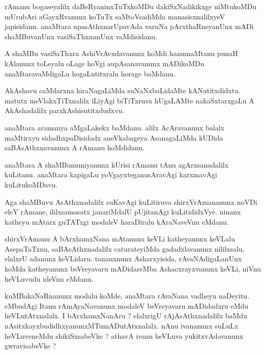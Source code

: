 \documentclass{article}
\begin{document}
\begin{mn}
rAmanu  bogaseyalilx  daBeRyaninxTuTxkoMDu  dakiSxNadikikxge  niMtukoMDu  mUrubAri  aGayxRvanunx  koTuTx  
saMtoVsadiMda  manasisxnalilxyeV  japisidanu.  anaMtara  upasAthxnarUpavAda  varuNa  pArxthaRneyanUnx  mADi  
shaMBuvanUnx  vasiSaThxnanUnx  vaMdisidanu.
\end{mn}

\begin{mn}
A  shaMBu  vasiSaThxra  AshiVrAvxdavanunx  hoMdi  hanumaMtanu  punaH  kAlanunx  toLeyalu  oLage  hoVgi  
aupAsanavanunx  mADikoMDu  anaMtaravaMdigaLu  hogaLutitxralu  horage  baMdanu.
\end{mn}

\begin{mn}
AkAshavu  caMdarxna  kiraNagaLiMda  suNaNxbaLidaMte  kANutitxdidxtu.  matutx  meVlakxTiTxnalilx  iLiyAgi  
biTiTxruva  hUgaLAMte  nakaSxtarxgaLu  A  AkAshadalilx  parxkAshisutitxdudxvu.
\end{mn}

\begin{mn}
anaMtara  aramanya  aMgaLakekx  baMdanu.  alilx  AcAravanunx  balalx  maMtirxyu  sidadhxpaDisidadx  
aneVkabageya  AsanagaLiMda  kUDida  saBAsAthxnavanunx  A  rAmanu  hoMdidanu.
\end{mn}

\begin{mn}
anaMtara  A  shaMBumuniyanunx  kUrisi  rAmanu  tAnu  agArxsanadalilx  kuLitanu.  anaMtara  kapigaLu  
yoVgayxteganusAravAgi  karxmavAgi  kuLitukoMDavu.
\end{mn}

\begin{mn}
Aga  shaMBuvu  AsAthxnadalilx  suKavAgi  kuLitiruva  shirxVrAmananunx  noVDi  eleY  rAmane,  ililxsamasatx  
janariMdalU  pUjitanAgi  kuLitididxVye.  ninanx  katheyu  mAtarx  guTATxgi  modaleV  haraDiralu  kAraNaveVnu  eMdanu.
\end{mn}

\begin{mn}
shirxVrAmanu  A  bArxhamxNana  mAtanunx  keVLi  katheyanunx  keVLalu  AsepaTaTxnu,  saBAsAthxnadalilx  caturateyiMda  
gadadxlavanunx  nililxsalu,  elalxrU  adanunx  keVLidaru.  tananxnunx  Asharxyisida,  rAvaNAdigaLanUnx  koMda  
katheyanunx  beVreyavaru  mADidareMba  Ashacxrayxvanunx  keVLi,  niVnu  heVLuvudu  ideVnu  eMdanu.
\end{mn}

\begin{mn}
kuMBakaNaRnanunx  modalu  koMde,  anaMtara  rAvaNana  vadheyu  naDeyitu.  eMbudAgi  Itanu  rAmAyaNavanunx  
modaleV  beVreyavaru  mADidadxru  eMdu  heVLutAtxnalalx.  I  bArxhamxNanAru ?  elalxrigU  rAjAsAthxnadalilx  
baMdu  nAsitxkayxbudidhxyanunxMTumADutAtxnalalx.  nAnu  ivananunx  suLuLx  heVLuveneMdu  shikiSxsabeVke ?  
athavA  ivanu  heVLuva  yukitxvAdavanunx  gwravisabeVke ?
\end{mn}
\end{document}
